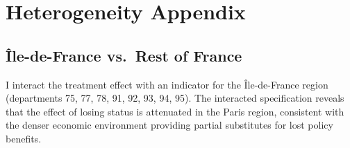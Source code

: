 \documentclass[12pt]{article}
\begin{document}



\section{Heterogeneity Appendix}

\subsection{\^Ile-de-France vs.\ Rest of France}

I interact the treatment effect with an indicator for the \^Ile-de-France region (departments 75, 77, 78, 91, 92, 93, 94, 95). The interacted specification reveals that the effect of losing status is attenuated in the Paris region, consistent with the denser economic environment providing partial substitutes for lost policy benefits.
\end{document}
